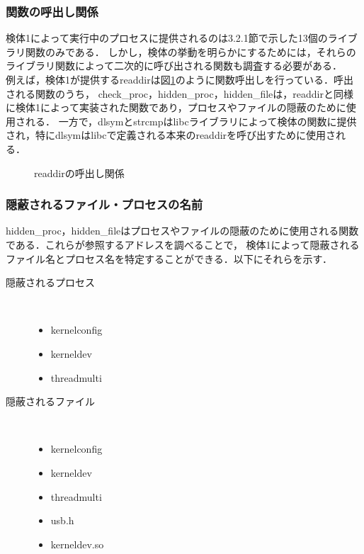 \documentclass[submit,techreq,noauthor]{eco}	%
\begin{document}
\subsubsection{関数の呼出し関係}
検体1によって実行中のプロセスに提供されるのは3.2.1節で示した13個のライブラリ関数のみである．
しかし，検体の挙動を明らかにするためには，それらのライブラリ関数によって二次的に呼び出される関数も調査する必要がある．\\
\indent
例えば，検体1が提供するreaddirは図\ref{fig:call-graph}のように関数呼出しを行っている．呼出される関数のうち，
check\_proc，hidden\_proc，hidden\_fileは，readdirと同様に検体1によって実装された関数であり，プロセスやファイルの隠蔽のために使用される．
一方で，dlsymとstrcmpはlibcライブラリによって検体の関数に提供され，特にdlsymはlibcで定義される本来のreaddirを呼び出すために使用される．\\


\begin{figure}[t]
	\centering
	\caption{readdirの呼出し関係}
	\label{fig:call-graph}
\end{figure}

\subsubsection{隠蔽されるファイル・プロセスの名前}
hidden\_proc，hidden\_fileはプロセスやファイルの隠蔽のために使用される関数である．これらが参照するアドレスを調べることで，
検体1によって隠蔽されるファイル名とプロセス名を特定することができる．以下にそれらを示す．
\begin{description}
  \item[隠蔽されるプロセス]　
  \begin{itemize}
    \item kernelconfig
    \item kerneldev
    \item threadmulti
  \end{itemize}
  \item[隠蔽されるファイル]　
  \begin{itemize}
    \item kernelconfig
    \item kerneldev
    \item threadmulti
    \item usb.h
    \item kerneldev.so \\
  \end{itemize}
\end{description}
\end{document}
